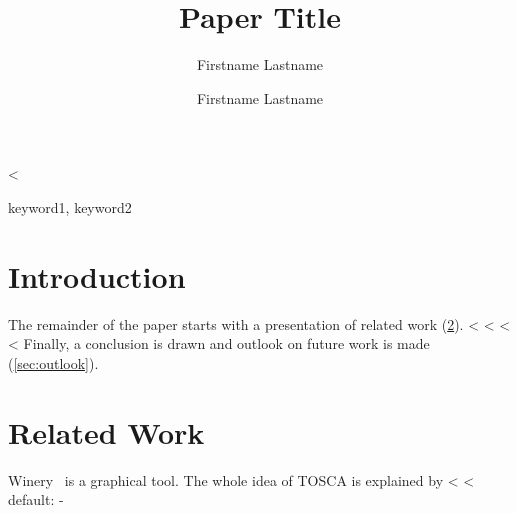 \documentclass[runningheads,a4paper,ngerman]{llncs}[2022/01/12]
\begin{document}
<%

\title{Paper Title}

\author{Firstname Lastname \and Firstname Lastname}



%
%

\maketitle

\begin{abstract}
  \lipsum[1]
\end{abstract}

\begin{keywords}
  keyword1, keyword2
\end{keywords}

\section{Introduction}
\label{sec:intro}
\lipsum[1-3]

The remainder of the paper starts with a presentation of related work (\cref{sec:relatedwork}).
<%
<%
<%
<%
Finally, a conclusion is drawn and outlook on future work is made (\cref{sec:outlook}).

\section{Related Work}
\label{sec:relatedwork}

Winery~\cite{Winery} is a graphical  tool.
The whole idea of TOSCA is explained by <%
<%
default:  -%
\Titelblatt
\end{document}
